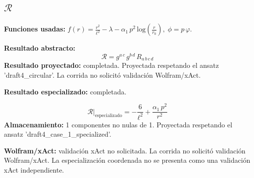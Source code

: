\documentclass[11pt]{article}
\begin{document}
\subsection*{$ \mathcal{R} $}
\textbf{Funciones usadas:} $ f\!\left(r\right) = \frac{{r}^{2}}{{\ell}^{2}} - \lambda - \alpha_{1}\,{p}^{2}\,\mathrm{log}\!\left(\frac{r}{r_{0}}\right),\;\phi=p\,\varphi $.\par
\textbf{Resultado abstracto:}
\begin{dmath*}[breakdepth={5}]
\mathcal{R} = g{}^{a\,c}\,g{}^{b\,d}\,R{}_{a\,b\,c\,d}
\end{dmath*}
\textbf{Resultado proyectado:} completada. Proyectada respetando el ansatz 'draft4\_circular'. La corrida no solicitó validación Wolfram/xAct.\par
\textbf{Resultado especializado:} completada.\par
\begin{dmath*}[breakdepth={5}]
\mathcal{R}\big|_{\mathrm{especializado}} = -\frac{6}{{\ell}^{2}} + \frac{\alpha_{1}\,{p}^{2}}{{r}^{2}}
\end{dmath*}
\textbf{Almacenamiento:} 1 componentes no nulas de 1. Proyectada respetando el ansatz 'draft4\_case\_1\_specialized'.\par
\textbf{Wolfram/xAct:} validación xAct no solicitada. La corrida no solicitó validación Wolfram/xAct. La especialización coordenada no se presenta como una validación xAct independiente.\par\medskip
{}
\end{document}
